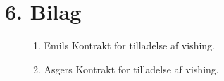 \documentclass[11pt]{report}
\begin{document}
\chapter*{6. Bilag}
\begin{figure}[H]
  \caption*{1. Emils Kontrakt for tilladelse af vishing.}
\end{figure}
\begin{figure}[H]
  \caption*{2. Asgers Kontrakt for tilladelse af vishing.}
\end{figure}
\end{document}
